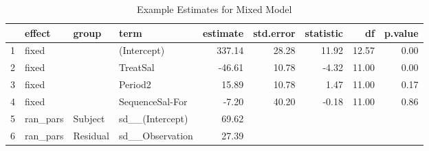 \begin{table}[ht]
\centering
\begin{tabular}{rlll|rrrrr}
  \hline
 & effect & group & term & estimate & std.error & statistic & df & p.value \\ 
  \hline
1 & fixed &  & (Intercept) & 337.14 & 28.28 & 11.92 & 12.57 & 0.00 \\ 
  2 & fixed &  & TreatSal & -46.61 & 10.78 & -4.32 & 11.00 & 0.00 \\ 
  3 & fixed &  & Period2 & 15.89 & 10.78 & 1.47 & 11.00 & 0.17 \\ 
  4 & fixed &  & SequenceSal-For & -7.20 & 40.20 & -0.18 & 11.00 & 0.86 \\ 
  5 & ran\_pars & Subject & sd\_\_(Intercept) & 69.62 &  &  &  &  \\ 
  6 & ran\_pars & Residual & sd\_\_Observation & 27.39 &  &  &  &  \\ 
   \hline
\end{tabular}
\caption{Example Estimates for Mixed Model} 
\label{modelTable}
\end{table}

